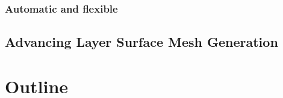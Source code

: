 \subsubsection{Automatic and flexible}

\subsection{Advancing Layer Surface Mesh Generation}

\section{Outline}
